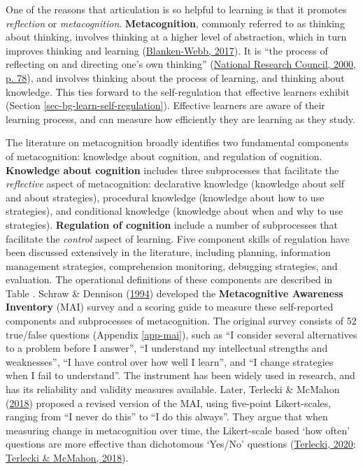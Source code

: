 \documentclass[letterpaper, nobind]{templates/ociamthesis}
\begin{document}
One of the reasons that articulation is so helpful to learning is that
it promotes \emph{reflection} or \emph{metacognition}. \textbf{Metacognition}, commonly
referred to as thinking about thinking, involves thinking at a higher
level of abstraction, which in turn improves thinking and learning
(\protect\hyperlink{ref-blanken2017metacognition}{Blanken-Webb, 2017}). It is ``the process of reflecting on and
directing one's own thinking'' (\protect\hyperlink{ref-council2000how}{National Research Council, 2000, p. 78}), and involves
thinking about the process of learning, and thinking about knowledge.
This ties forward to the self-regulation that effective learners exhibit
(Section \ref{sec-bg-learn-self-regulation}). Effective learners are aware
of their learning process, and can measure how efficiently they are
learning as they study.

The literature on metacognition broadly identifies two fundamental
components of metacognition: knowledge about cognition, and regulation
of cognition. \textbf{Knowledge about cognition} includes three subprocesses
that facilitate the \emph{reflective} aspect of metacognition: declarative
knowledge (knowledge about self and about strategies), procedural
knowledge (knowledge about how to use strategies), and conditional
knowledge (knowledge about when and why to use strategies). \textbf{Regulation
of cognition} include a number of subprocesses that facilitate the
\emph{control} aspect of learning. Five component skills of regulation have
been discussed extensively in the literature, including planning,
information management strategies, comprehension monitoring, debugging
strategies, and evaluation. The operational definitions of these
components are described in Table
.
Schraw \& Dennison (\protect\hyperlink{ref-schraw1994assessing}{1994})
developed the \textbf{Metacognitive Awareness Inventory} (MAI) survey and a
scoring guide to measure these self-reported components and subprocesses
of metacognition. The original survey consists of 52 true/false
questions (Appendix \ref{app-mai}), such as ``I consider several alternatives to a
problem before I answer'', ``I understand my intellectual strengths and
weaknesses'', ``I have control over how well I learn'', and ``I change
strategies when I fail to understand''. The instrument has been widely
used in research, and has its reliability and validity measures
available. Later, Terlecki \& McMahon (\protect\hyperlink{ref-terlecki2018call}{2018}) proposed a revised version of the
MAI, using five-point Likert-scales, ranging from ``I never do this'' to
``I do this always''. They argue that when measuring change in
metacognition over time, the Likert-scale based `how often' questions
are more effective than dichotomous `Yes/No' questions
(\protect\hyperlink{ref-terlecki2020revising}{Terlecki, 2020}; \protect\hyperlink{ref-terlecki2018call}{Terlecki \& McMahon, 2018}).
\end{document}
